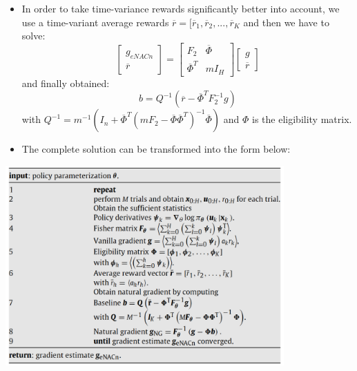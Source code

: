 {\begin{pcolumn}
{\begin{itemize}
	\item In order to take time-variance rewards significantly better into account, we use a time-variant average rewards $\overline r = [\overline r_1, \overline r_2, ..., \overline r_K$ and then we have to solve:  \vspace{-2mm}
\begin{equation}
\left[
	\begin{matrix}
		g_{eNACn} \\
		\overline r
	\end{matrix}
	\right] = 
\left[
	\begin{matrix}
		F_2 & \overline \Phi \\
		\overline \Phi^T & mI_H
	\end{matrix}
	\right]
\left[
	\begin{matrix}
		g \\
		\overline r
	\end{matrix}
	\right]
\end{equation}
and finally obtained:
\begin{equation}
	b = Q^{-1}(\overline r - \overline \Phi^T F_2^{-1}g)
\end{equation}
with $Q^{-1} = m^{-1}(I_n + \overline\Phi^T(mF_2-\overline\Phi\overline\Phi^T)^{-1}\overline\Phi)$ and $\Phi$ is the eligibility matrix. 
	\item The complete solution can be transformed into the form below:
\end{itemize}
\begin{center}
	\includegraphics[width=0.8\textwidth]{img/algorithm.png}
	\vspace*{-13mm}
\end{center}
\vspace*{-2mm}
}

\end{pcolumn}
}



\makeposter

